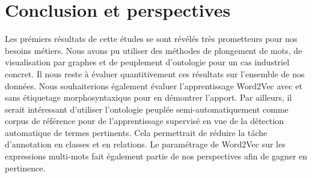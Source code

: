 \section{Conclusion et perspectives}
Les prémiers résultats de cette études se sont révélés très prometteurs pour nos besoins métiers. Nous avons pu utiliser des méthodes de plongement de mots, de visualisation par graphes et de peuplement d'ontologie pour un cas industriel concret. Il nous reste à évaluer quantitivement ces résultats sur l'ensemble de nos données. Nous souhaiterions également évaluer l'apprentissage Word2Vec avec et sans étiquetage morphosyntaxique pour en démontrer l'apport. Par ailleurs, il serait intéressant d'utiliser l'ontologie peuplée semi-automatiquement comme corpus de référence pour de l'apprentissage supervisé en vue de la détection automatique de termes pertinents. Cela permettrait de réduire la tâche d'annotation en classes et en relations.
Le paramétrage de Word2Vec sur les expressions multi-mots fait également partie de nos perspectives afin de gagner en pertinence.
